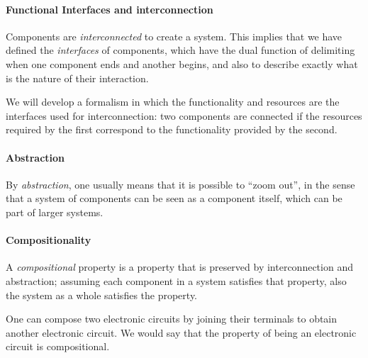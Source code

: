 \paragraph{Functional Interfaces and interconnection}

Components are \emph{interconnected} to create a system.
This implies that we have defined the \emph{interfaces} of components, which
have the dual function of delimiting when one component ends and another begins,
and also to describe exactly what is the nature of their interaction.

We will develop a formalism in which the functionality and resources
are the interfaces used for interconnection: two components are connected
if the resources required by the first correspond to the functionality
provided by the second.

\paragraph{Abstraction}

By \emph{abstraction}, one usually means that it is possible to ``zoom out'',
in the sense that a system of components can be seen as a component itself,
which can be part of larger systems.


\paragraph{Compositionality}

A \emph{compositional} property is a property that is preserved by interconnection and abstraction; assuming each component in a system satisfies that property, also the system as a whole satisfies the property.

\begin{example}
    One can compose two electronic circuits by joining their terminals to obtain
    another electronic circuit. We would say that the property
    of being an electronic circuit is compositional.
\end{example}




